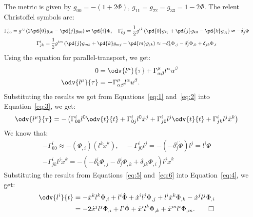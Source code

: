 \begin{solution}[(ii)]
  The metric is given by $g_{00} = -(1 + 2\Phi)$, $g_{11} = g_{22} = g_{33} = 1 - 2\Phi$. The relent Christoffel symbols are:
  \begin{gather}
    \Gamma_{00}^i = g^{ij}\left(2\pd{0}g_{j0} - \pd{j}g_{00}\right) \approx \pd{i} \Phi, \quad \Gamma_{0j}^i = \frac{1}{2}g^{ik}\left(\pd{0}g_{kj} + \pd{j}g_{k0} - \pd{k}g_{0j}\right) \approx -\delta_j^i \Phi\label{eq:1} \\
    \Gamma_{jk}^i = \frac{1}{2}g^{im}\left(\pd{j}g_{mk} + \pd{k}g_{mj} - \pd{m}g_{jk}\right) \approx -\delta_k^i \Phi_{,j} - \delta_j^i \Phi_{,k} + \delta_{jk}\Phi_{,i}\label{eq:2}
  \end{gather}
  Using the equation for parallel-transport, we get:
  \begin{align}
    0 &= \odv{l^\mu}{\tau} + \Gamma_{\alpha\beta}^\mu l^\alpha u^\beta \tag*{} \\
    \odv{l^\mu}{\tau} &= -\Gamma_{\alpha\beta}^\mu l^\alpha u^\beta\label{eq:3}
  .\end{align}
  Substituting the results we got from Equations~\eqref{eq:1} and~\eqref{eq:2} into Equation~\eqref{eq:3}, we get:
  \begin{equation}\label{eq:4}
    \odv{l^\mu}{\tau} = -\left(
      \Gamma_{00}^i l^0 \odv{t}{t} +
      \Gamma_{0j}^i l^0\dot{x}^j +
      \Gamma_{j0}^i l^j \odv{t}{t} +
      \Gamma_{jk}^i l^j\dot{x}^k
    \right)
  \end{equation}
  We know that:
  \begin{gather}
    -\Gamma_{00}^i \approx -\left(\Phi_{,i}\right)\left(l^k\dot{x}^k\right), \quad -\Gamma_{j0}^i l^j = -\left(-\delta_j^i \dot{\Phi}\right)l^j = l^i\Phi\label{eq:5} \\
    -\Gamma_{jk}^i l^j\dot{x}^k = -\left(-\delta_k^i \Phi_{,j} - \delta_j^i\Phi_{,k} + \delta_{jk}\Phi_{,i}\right)l^j\dot{x}^k\label{eq:6}
  \end{gather}
  Substituting the results from Equations~\eqref{eq:5} and~\eqref{eq:6} into Equation~\eqref{eq:4}, we get:
  \begin{align*}
    \odv{l^i}{t} &= -\dot{x}^kl^k\Phi_{,i} + l^i\dot{\Phi} + \dot{x}^il^j\Phi_{,j} + l^i\dot{x}^k\Phi_{,k} - \dot{x}^jl^j\Phi_{,i} \\
                 &= -2\dot{x}^jl^j\Phi_{,i} + l^i\dot{\Phi} + \dot{x}^il^k\Phi_{,k} + \dot{x}^ml^i\Phi_{,m}
  .\qedhere\end{align*}
\end{solution}

